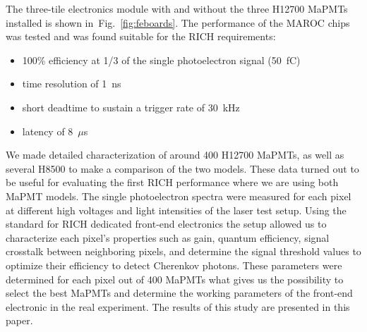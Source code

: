 The three-tile electronics module with and without the three H12700 MaPMTs installed is shown in~Fig.~\ref{fig:feboards}.
The performance of the MAROC chips was tested and was found suitable for the RICH requirements:
\begin{itemize}
	\item 100\% efficiency at 1/3 of the single photoelectron signal (50~fC)
	\item time resolution of 1~ns
	\item short deadtime to sustain a trigger rate of 30~kHz
	\item latency of 8~$\mu$s
\end{itemize}
We made detailed characterization of around 400 H12700 MaPMTs, as well as several H8500 to make a comparison of the two models. These data turned out to be useful for evaluating the first RICH performance  where we 
are using both MaPMT models. 
The single photoelectron spectra were measured for each pixel at different high voltages and light intensities of the laser test setup. Using the standard for RICH dedicated front-end electronics the setup allowed us to characterize each pixel’s properties such as gain, quantum efficiency, signal crosstalk between neighboring pixels, and determine the signal threshold values to optimize their efficiency to detect Cherenkov photons. These parameters were determined for each pixel out of 400 MaPMTs what gives us the possibility to select the best MaPMTs and determine the working parameters of the front-end electronic in the real experiment. The results of this study are presented in this paper. 


